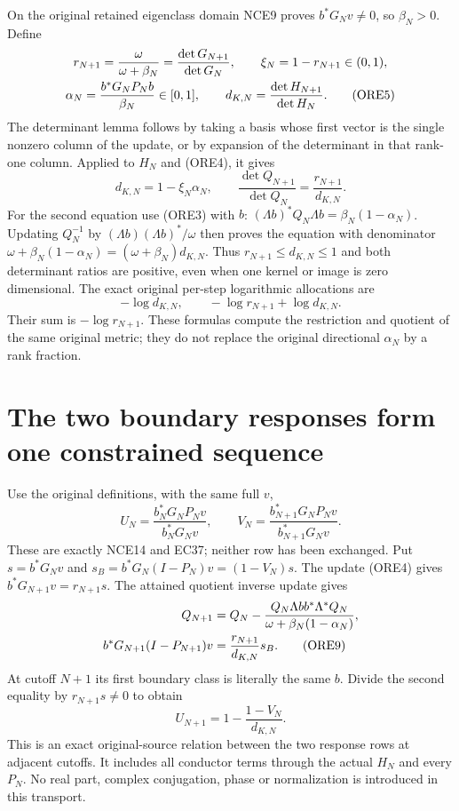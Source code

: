 On the original retained eigenclass domain NCE9 proves
$b^*G_Nv\ne0$, so $\beta_N>0$. Define
\begin{gather}
 r_{N+1}=\frac{\omega}{\omega+\beta_N}
        =\frac{\det G_{N+1}}{\det G_N},\qquad
 \xi_N=1-r_{N+1}\in(0,1),\notag\\
 \alpha_N=\frac{b^*G_NP_Nb}{\beta_N}\in[0,1],\qquad
 d_{K,N}=\frac{\det H_{N+1}}{\det H_N}.                \tag{ORE5}
\end{gather}
The determinant lemma follows by taking a basis whose first vector is
the single nonzero column of the update, or by expansion of the
determinant in that rank-one column. Applied to $H_N$ and (ORE4), it gives
\begin{equation}\tag{ORE6}
 \boxed{d_{K,N}=1-\xi_N\alpha_N,\qquad
 \frac{\det Q_{N+1}}{\det Q_N}=
       \frac{r_{N+1}}{d_{K,N}}.}
\end{equation}
For the second equation use (ORE3) with $b$:
$(\Lambda b)^*Q_N\Lambda b=\beta_N(1-\alpha_N)$.
Updating $Q_N^{-1}$ by $(\Lambda b)(\Lambda b)^*/\omega$
then proves the equation with denominator
$\omega+\beta_N(1-\alpha_N)=(\omega+\beta_N)d_{K,N}$.
Thus $r_{N+1}\le d_{K,N}\le1$ and both determinant ratios are
positive, even when one kernel or image is zero dimensional.
The exact original per-step logarithmic allocations are
\begin{equation}\tag{ORE7}
 -\log d_{K,N},\qquad
 -\log r_{N+1}+\log d_{K,N}.
\end{equation}
Their sum is $-\log r_{N+1}$. These formulas compute the
restriction and quotient of the same original metric; they do not
replace the original directional $\alpha_N$ by a rank fraction.

\section{The two boundary responses form one constrained sequence}
Use the original definitions, with the same full $v$,
\[
 U_N=\frac{b_N^*G_NP_Nv}{b_N^*G_Nv},\qquad
 V_N=\frac{b_{N+1}^*G_NP_Nv}{b_{N+1}^*G_Nv}.           \tag{ORE8}
\]
These are exactly NCE14 and EC37; neither row has been exchanged.
Put $s=b^*G_Nv$ and $s_B=b^*G_N(I-P_N)v=(1-V_N)s$.
The update (ORE4) gives $b^*G_{N+1}v=r_{N+1}s$.
The attained quotient inverse update gives
\begin{align}
 Q_{N+1}&=Q_N-
 \frac{Q_N\Lambda b b^*\Lambda^*Q_N}
 {\omega+\beta_N(1-\alpha_N)},\notag\\
 b^*G_{N+1}(I-P_{N+1})v
 &=\frac{r_{N+1}}{d_{K,N}}s_B.                       \tag{ORE9}
\end{align}
At cutoff $N+1$ its first boundary class is literally the same $b$.
Divide the second equality by $r_{N+1}s\ne0$ to obtain
\begin{equation}\tag{ORE10}
 \boxed{\displaystyle
 U_{N+1}=1-\frac{1-V_N}{d_{K,N}}.}
\end{equation}
This is an exact original-source relation between the two response
rows at adjacent cutoffs. It includes all conductor terms through
the actual $H_N$ and every $P_N$. No real part, complex conjugation,
phase or normalization is introduced in this transport.

